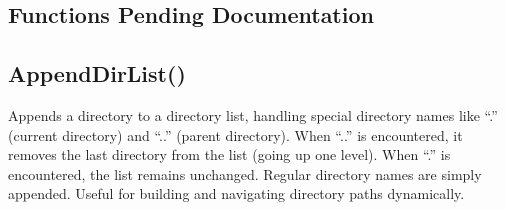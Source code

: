 \documentclass[letterpaper,10pt,english]{sphinxmanual}
\begin{document}
\sphinxAtStartPar
{}

\sphinxAtStartPar
{}


\subsection{Functions Pending Documentation}
\label{\detokenize{reference/utility:functions-pending-documentation}}
\ignorespaces 

\subsection{AppendDirList()}
\label{\detokenize{reference/utility:appenddirlist}}\label{\detokenize{reference/utility:index-47}}
\sphinxAtStartPar
{}

\sphinxAtStartPar
{}

\sphinxAtStartPar
Appends a directory to a directory list, handling special directory names like “.” (current directory) and “..” (parent directory). When “..” is encountered, it removes the last directory from the list (going up one level). When “.” is encountered, the list remains unchanged. Regular directory names are simply appended. Useful for building and navigating directory paths dynamically.

\sphinxAtStartPar
{}

\begin{sphinxVerbatim}[commandchars=\\\{\}]
\end{sphinxVerbatim}

\sphinxAtStartPar
{}
\end{document}

